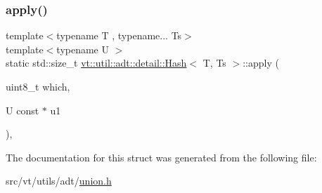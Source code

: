 \subsubsection{\texorpdfstring{apply()}{apply()}}
{\footnotesize\ttfamily template$<$typename T , typename... Ts$>$ \\
template$<$typename U $>$ \\
static std\+::size\+\_\+t \hyperlink{structvt_1_1util_1_1adt_1_1detail_1_1_hash}{vt\+::util\+::adt\+::detail\+::\+Hash}$<$ T, Ts $>$\+::apply (\begin{DoxyParamCaption}\item[{uint8\+\_\+t}]{which,  }\item[{U const $\ast$}]{u1 }\end{DoxyParamCaption})\hspace{0.3cm}{\ttfamily [inline]}, {\ttfamily [static]}}



The documentation for this struct was generated from the following file\+:\begin{DoxyCompactItemize}
\item 
src/vt/utils/adt/\hyperlink{union_8h}{union.\+h}\end{DoxyCompactItemize}
